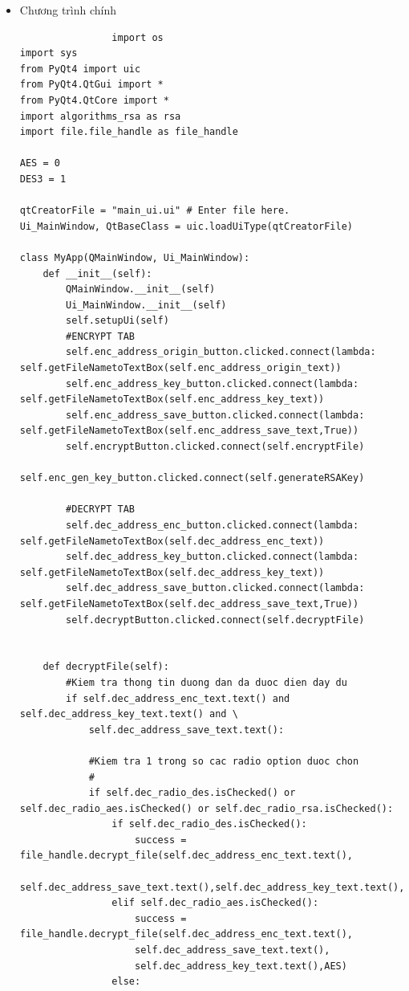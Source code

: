 \documentclass[a4paper]{article}
\begin{document}
\begin{itemize}
\begin{lstlisting}
			\end{lstlisting}
	\item
		Chương trình chính
		\begin{lstlisting}
				import os
import sys
from PyQt4 import uic
from PyQt4.QtGui import *
from PyQt4.QtCore import *
import algorithms_rsa as rsa
import file.file_handle as file_handle

AES = 0
DES3 = 1

qtCreatorFile = "main_ui.ui" # Enter file here. 
Ui_MainWindow, QtBaseClass = uic.loadUiType(qtCreatorFile)
 
class MyApp(QMainWindow, Ui_MainWindow):
    def __init__(self):
        QMainWindow.__init__(self)
        Ui_MainWindow.__init__(self)
        self.setupUi(self)
        #ENCRYPT TAB
        self.enc_address_origin_button.clicked.connect(lambda: self.getFileNametoTextBox(self.enc_address_origin_text))
        self.enc_address_key_button.clicked.connect(lambda: self.getFileNametoTextBox(self.enc_address_key_text))
        self.enc_address_save_button.clicked.connect(lambda: self.getFileNametoTextBox(self.enc_address_save_text,True))
        self.encryptButton.clicked.connect(self.encryptFile)
        self.enc_gen_key_button.clicked.connect(self.generateRSAKey)

        #DECRYPT TAB
        self.dec_address_enc_button.clicked.connect(lambda: self.getFileNametoTextBox(self.dec_address_enc_text))
        self.dec_address_key_button.clicked.connect(lambda: self.getFileNametoTextBox(self.dec_address_key_text))
        self.dec_address_save_button.clicked.connect(lambda: self.getFileNametoTextBox(self.dec_address_save_text,True))
        self.decryptButton.clicked.connect(self.decryptFile)


    def decryptFile(self):
        #Kiem tra thong tin duong dan da duoc dien day du
        if self.dec_address_enc_text.text() and self.dec_address_key_text.text() and \
            self.dec_address_save_text.text():

            #Kiem tra 1 trong so cac radio option duoc chon
            #
            if self.dec_radio_des.isChecked() or self.dec_radio_aes.isChecked() or self.dec_radio_rsa.isChecked():
                if self.dec_radio_des.isChecked():
                    success = file_handle.decrypt_file(self.dec_address_enc_text.text(),
                    self.dec_address_save_text.text(),self.dec_address_key_text.text(),DES3)
                elif self.dec_radio_aes.isChecked():
                    success = file_handle.decrypt_file(self.dec_address_enc_text.text(),
                    self.dec_address_save_text.text(),
                    self.dec_address_key_text.text(),AES)
                else:


\end{lstlisting}
\end{itemize}
\end{document}
